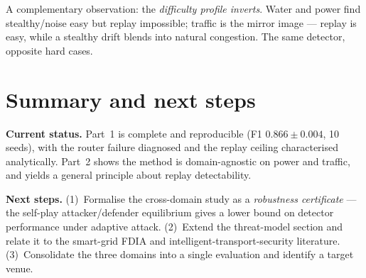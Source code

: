 \documentclass[11pt,a4paper]{article}
\begin{document}
A complementary observation: the \emph{difficulty profile inverts}.
Water and power find stealthy/noise easy but replay impossible; traffic is
the mirror image --- replay is easy, while a stealthy drift blends into
natural congestion. The same detector, opposite hard cases.

\section{Summary and next steps}

\textbf{Current status.} Part~1 is complete and reproducible
(F1 $0.866\pm0.004$, 10 seeds), with the router failure diagnosed and the
replay ceiling characterised analytically. Part~2 shows the method is
domain-agnostic on power and traffic, and yields a general principle about
replay detectability.

\textbf{Next steps.} (1)~Formalise the cross-domain study as a
\emph{robustness certificate} --- the self-play attacker/defender
equilibrium gives a lower bound on detector performance under adaptive
attack. (2)~Extend the threat-model section and relate it to the
smart-grid FDIA and intelligent-transport-security literature.
(3)~Consolidate the three domains into a single evaluation and identify a
target venue.
\end{document}
